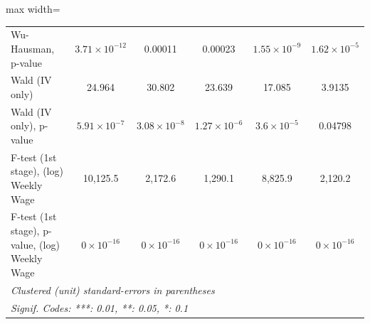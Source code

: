 \documentclass[
  10pt,
]{article}
\begin{document}
\begin{table}[htbp]
\begin{adjustbox}{max width=\textwidth}
\begin{tabular}{lccccc}
         Wu-Hausman, p-value                            & $3.71\times 10^{-12}$  & 0.00011                & 0.00023               & $1.55\times 10^{-9}$  & $1.62\times 10^{-5}$\\   
         Wald (IV only)                                 & 24.964                 & 30.802                 & 23.639                & 17.085                & 3.9135\\  
         Wald (IV only), p-value                        & $5.91\times 10^{-7}$   & $3.08\times 10^{-8}$   & $1.27\times 10^{-6}$  & $3.6\times 10^{-5}$   & 0.04798\\  
         F-test (1st stage), (log) Weekly Wage          & 10,125.5               & 2,172.6                & 1,290.1               & 8,825.9               & 2,120.2\\  
         F-test (1st stage), p-value, (log) Weekly Wage & $0\times 10^{-16}$     & $0\times 10^{-16}$     & $0\times 10^{-16}$    & $0\times 10^{-16}$    & $0\times 10^{-16}$\\   
         \midrule \midrule
         \multicolumn{6}{l}{\emph{Clustered (unit) standard-errors in parentheses}}\\
         \multicolumn{6}{l}{\emph{Signif. Codes: ***: 0.01, **: 0.05, *: 0.1}}\\
      \end{tabular}
   \end{adjustbox}
\end{table}
\end{document}
